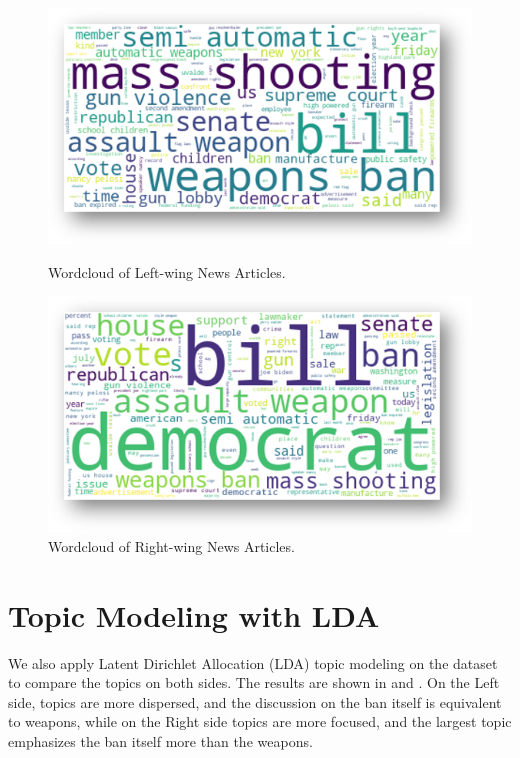 \begin{figure}[ht]
    \centering
    \begin{minipage}[b]{0.45\textwidth}
        \captionsetup{justification=centering}
        \includegraphics[width=\textwidth]{img/empirical-wordcloud-left}
        \caption{Wordcloud of Left-wing News Articles.}
        \label{fig:empirical-wordcloud-left}
    \end{minipage}
    \hfill
    \begin{minipage}[b]{0.45\textwidth}
        \captionsetup{justification=centering}
        \includegraphics[width=\textwidth]{img/empirical-wordcloud-right}
        \caption{Wordcloud of Right-wing News Articles.}
        \label{fig:empirical-wordcloud-right}
    \end{minipage}
\end{figure}

\section{Topic Modeling with LDA}
\label{empirical-lda}
We also apply Latent Dirichlet Allocation (LDA) topic modeling on the dataset to compare the topics on both sides. The results are shown in  and . On the Left side, topics are more dispersed, and the discussion on the ban itself is equivalent to weapons, while on the Right side topics are more focused, and the largest topic emphasizes the ban itself more than the weapons.

